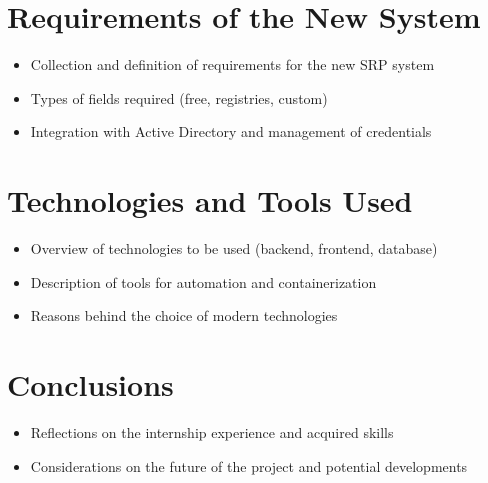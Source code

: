 \documentclass[a4paper, oneside, openright]{book}
\begin{document}
\tableofcontents  %
\newpage %
\setcounter{chapter}{-1} %
% 
% 






\chapter{Requirements of the New System}
\begin{itemize}
    \item Collection \cite{lamport1994latex} and definition of requirements for the new SRP system
    \item Types of fields required (free, registries, custom)
    \item Integration with Active Directory and management of credentials
\end{itemize}

\chapter{Technologies and Tools Used}
\begin{itemize}
    \item Overview of technologies to be used (backend, frontend, database)
    \item Description of tools for automation and containerization
    \item Reasons behind the choice of modern technologies
\end{itemize}

\chapter{Conclusions}
\begin{itemize}
    \item Reflections on the internship experience and acquired skills
    \item Considerations on the future of the project and potential developments
\end{itemize}

\backmatter
\sloppy %
\printbibliography[heading=bibintoc, title=Bibliography]

\end{document}
